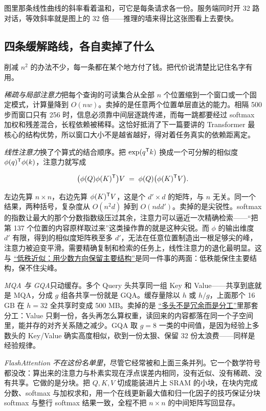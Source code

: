 图里那条线性曲线的斜率看着温和，可它是每条请求各一份。服务端同时开 32 路对话，等效斜率就是图上的 32 倍——推理的墙来得比这张图看上去要快。

\subsection{四条缓解路线，各自卖掉了什么}

削减 \(n^2\) 的办法不少，每一条都在某个地方付了钱。把代价说清楚比记住名字有用。

\emph{稀疏与局部注意力}把每个查询的可读集合从全部 \(n\) 个位置缩到一个窗口或一个固定模式，计算量降到 \(O(nw)\)。卖掉的是任意两个位置单层直达的能力。相隔 500 步而窗口只有 256 时，信息必须靠中间层逐跳传递，而每一跳都要经过 softmax 加权和残差混合，长程依赖被稀释。这恰好抵消了下一篇要讲的 Transformer 最核心的结构优势，所以窗口大小不是越省越好，得对着任务真实的依赖距离定。

\emph{线性注意力}换了个算式的结合顺序。把 \(\exp(q^{\mathsf{T}}k)\) 换成一个可分解的相似度 \(\phi(q)^{\mathsf{T}}\phi(k)\)，注意力就写成

\[
\bigl(\phi(Q)\phi(K)^{\mathsf{T}}\bigr)V \;=\; \phi(Q)\bigl(\phi(K)^{\mathsf{T}}V\bigr).
\]

左边先算 \(n\times n\)，右边先算 \(\phi(K)^{\mathsf{T}}V\)，这是个 \(d'\times d\) 的矩阵，与 \(n\) 无关。同一个结果，两种括号，复杂度从 \(O(n^2d)\) 掉到 \(O(nd d')\)。卖掉的是尖锐性。softmax 的指数让最大的那个分数指数级压过其余，注意力可以逼近一次精确检索——``把第 137 个位置的内容原样取过来''这类操作靠的就是这种尖锐。而 \(\phi\) 的输出维度 \(d'\) 有限，得到的相似度矩阵秩至多 \(d'\)，无法在任意位置制造出一根足够尖的峰，注意力被迫变平滑。需要精确复制和检索的任务上，线性注意力的退化最明显。这与 \hyperref[sec:03-Linear-Algebra/07-SVD-and-Data-Applications/03]{``低秩近似：用少数方向保留主要结构''}是同一件事的两面：低秩能保住主要结构，保不住尖峰。

\emph{MQA 与 GQA}只动缓存。多个 Query 头共享同一组 Key 和 Value——共享到底就是 MQA，分成 \(g\) 组各共享一份就是 GQA。缓存量除以 \(h\) 或 \(h/g\)，上面那个 16 GB 在 \(h=32\) 全共享时变成 500 MB。卖掉的是 \hyperref[sec:14-Deep-Learning/05-Attention-and-Sequence-Models/02]{``多头不是冗余而是分工''}里那套分工：Value 只剩一份，各头再怎么算权重，读回来的内容都落在同一个子空间里，能并存的对齐关系随之减少。GQA 取 \(g=8\) 一类的中间值，是因为经验上多数头的 Key/Value 确实高度相似，砍到一份太狠、保留 32 份太浪费——同样是经验规律。

\emph{FlashAttention 不在这份名单里}，尽管它经常被和上面三条并列。它一个数学符号都没改：算出来的注意力与朴素实现在浮点误差内相同，没有近似、没有稀疏、没有共享。它做的是分块。把 \(Q,K,V\) 切成能装进片上 SRAM 的小块，在块内完成分数、softmax 与加权求和，用一个在线更新最大值和归一化因子的技巧保证分块 softmax 与整行 softmax 结果一致，全程不把 \(n\times n\) 的中间矩阵写回显存。

